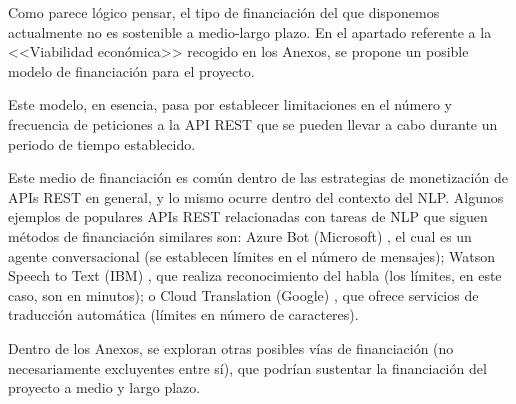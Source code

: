 Como parece lógico pensar, el tipo de financiación del que disponemos actualmente no es sostenible a medio-largo plazo. En el apartado referente a la <<Viabilidad económica>> recogido en los Anexos, se propone un posible modelo de financiación para el proyecto.

Este modelo, en esencia, pasa por establecer limitaciones en el número y frecuencia de peticiones a la API REST que se pueden llevar a cabo durante un periodo de tiempo establecido.

Este medio de financiación es común dentro de las estrategias de monetización de APIs REST en general, y lo mismo ocurre dentro del contexto del NLP. Algunos ejemplos de populares APIs REST relacionadas con tareas de NLP que siguen métodos de financiación similares son: Azure Bot (Microsoft) \cite{azure-bot}, el cual es un agente conversacional (se establecen límites en el número de mensajes); Watson Speech to Text (IBM) \cite{watson-stt}, que realiza reconocimiento del habla (los límites, en este caso, son en minutos); o Cloud Translation (Google) \cite{cloud-translation}, que ofrece servicios de traducción automática (límites en número de caracteres).

Dentro de los Anexos, se exploran otras posibles vías de financiación (no necesariamente excluyentes entre sí), que podrían sustentar la financiación del proyecto a medio y largo plazo.
